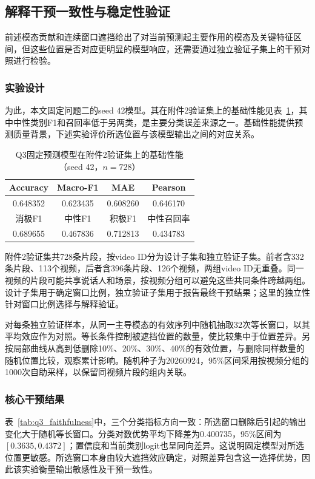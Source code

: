 \documentclass[UTF8,a4paper,12pt]{ctexart}
\newcommand{\QThreeParagraph}{\par\noindent\hspace*{2em}}
\begin{document}
\subsection{解释干预一致性与稳定性验证}\label{subsec:q3_faithfulness}
\QThreeParagraph 前述模态贡献和连续窗口遮挡给出了对当前预测起主要作用的模态及关键特征区间，但这些位置是否对应更明显的模型响应，还需要通过独立验证子集上的干预对照进行检验。

\subsubsection{实验设计}
\QThreeParagraph 为此，本文固定问题二的seed 42模型。其在附件2验证集上的基础性能见表~\ref{tab:q3_predictor}，其中中性类别F1和召回率低于另两类，是主要分类误差来源之一。基础性能提供预测质量背景，下述实验评价所选位置与该模型输出之间的对应关系。

\begin{table}[H]
\centering\small
\setlength{\tabcolsep}{6pt}
\caption{Q3固定预测模型在附件2验证集上的基础性能（seed 42，$n=728$）}
\label{tab:q3_predictor}
\begin{tabular}{@{}cccc@{}}
\toprule
Accuracy & Macro-F1 & MAE & Pearson\\
\midrule
0.648352 & 0.623435 & 0.608260 & 0.646170\\
\midrule
\QThreeParagraph 消极F1 & 中性F1 & 积极F1 & 中性召回率\\
\midrule
0.689655 & 0.467836 & 0.712813 & 0.434783\\
\bottomrule
\end{tabular}
\end{table}

\QThreeParagraph 附件2验证集共728条片段，按video ID分为设计子集和独立验证子集。前者含332条片段、113个视频，后者含396条片段、126个视频，两组video ID无重叠。同一视频的片段可能共享说话人和场景，按视频分组可以避免这些共同条件跨越两组。设计子集用于确定窗口比例，独立验证子集用于报告最终干预结果；这里的独立性针对窗口比例选择与解释验证。

\QThreeParagraph 对每条独立验证样本，从同一主导模态的有效序列中随机抽取32次等长窗口，以其平均效应作为对照。等长条件控制被遮挡位置的数量，使比较集中于位置差异。另按局部曲线从高到低删除10\%、20\%、30\%、40\%的有效位置，与删除同样数量的随机位置比较，观察累计影响。随机种子为20260924，95\%区间采用按视频分组的1000次自助采样，以保留同视频片段的组内关联。

\subsubsection{核心干预结果}
\QThreeParagraph 表~\ref{tab:q3_faithfulness}中，三个分类指标方向一致：所选窗口删除后引起的输出变化大于随机等长窗口。分类对数优势平均下降差为0.400735，95\%区间为$[0.3635,0.4372]$；置信度和当前类别logit也呈同向差异。这说明固定模型对所选位置更敏感。所选窗口本身由较大遮挡效应确定，对照差异包含这一选择优势，因此该实验衡量输出敏感性及干预一致性。
\end{document}
